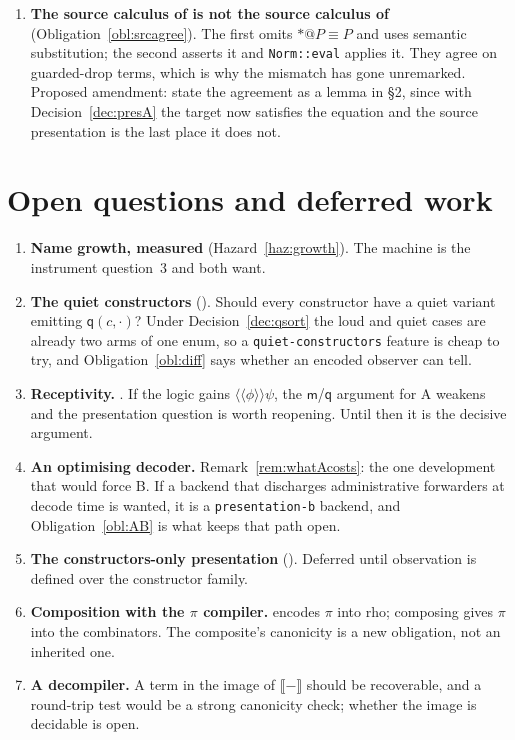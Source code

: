 \documentclass[11pt,a4paper]{article}
\makeatletter
\newcommand{\code}[1]{\texttt{#1}}
\newcommand{\quo}[1]{@#1}
\newcommand{\drp}[1]{{*}#1}
\newcommand{\enc}[1]{\llbracket #1 \rrbracket}
\newcommand{\mm}{\mathsf{m}}
\newcommand{\qq}{\mathsf{q}}
\newcommand{\scong}{\equiv}
\newcommand{\rcp}[1]{\langle\!\langle #1 \rangle\!\rangle}
\theoremstyle{definition}
\theoremstyle{plain}
\makeatother
\begin{document}
\begin{enumerate}[leftmargin=1.8em]
\item \textbf{The source calculus of \cite[\S2]{draft3} is not the source
calculus of \cite[Def.~2.6]{k1ndl1ng}} (Obligation~\ref{obl:srcagree}). The
first omits $\drp{\quo{P}} \scong P$ and uses semantic substitution; the
second asserts it and \code{Norm::eval} applies it. They agree on
guarded-drop terms, which is why the mismatch has gone unremarked. Proposed
amendment: state the agreement as a lemma in \S2, since with
Decision~\ref{dec:presA} the target now satisfies the equation and the source
presentation is the last place it does not.

\end{enumerate}

\section{Open questions and deferred work}

\begin{enumerate}[leftmargin=1.8em]
\item \textbf{Name growth, measured} (Hazard~\ref{haz:growth}). The machine is
the instrument \cite[\S12]{draft3} question~3 and \cite[\S7]{logic} both want.
\item \textbf{The quiet constructors} (\cite[Rem.~7.12]{draft3}). Should every
constructor have a quiet variant emitting $\qq(c,\cdot)$? Under
Decision~\ref{dec:qsort} the loud and quiet cases are already two arms of one
enum, so a \code{quiet-constructors} feature is cheap to try, and
Obligation~\ref{obl:diff} says whether an encoded observer can tell.
\item \textbf{Receptivity.} \cite[open item~5]{logic}. If the logic gains
$\rcp{\phi}\psi$, the $\mm$/$\qq$ argument for A weakens and the presentation
question is worth reopening. Until then it is the decisive argument.
\item \textbf{An optimising decoder.} Remark~\ref{rem:whatAcosts}: the one
development that would force B. If a backend that discharges administrative
forwarders at decode time is wanted, it is a \code{presentation-b} backend,
and Obligation~\ref{obl:AB} is what keeps that path open.
\item \textbf{The constructors-only presentation}
(\cite[\S10]{draft3}). Deferred until observation is defined over the
constructor family.
\item \textbf{Composition with the $\pi$ compiler.} \cite{nowns} encodes $\pi$
into rho; composing gives $\pi$ into the combinators. The composite's
canonicity is a new obligation, not an inherited one.
\item \textbf{A decompiler.} A term in the image of $\enc{-}$ should be
recoverable, and a round-trip test would be a strong canonicity check;
whether the image is decidable is open.
\end{enumerate}
\end{document}
